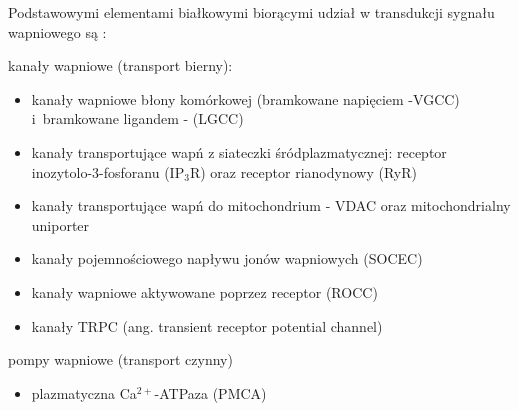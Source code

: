 Podstawowymi elementami białkowymi biorącymi udział w transdukcji sygnału wapniowego są \cite{Berridge2012,Lytton2007,Schwaller2012}:

\begin{bulletList}
\label{bialkaTransportowe}

\item kanały wapniowe (transport bierny):
	\begin{itemize}[label=\textopenbullet]
	\item kanały wapniowe błony komórkowej (bramkowane napięciem -VGCC) \\ i~bramkowane ligandem - (LGCC)
	\item kanały transportujące wapń z siateczki śródplazmatycznej: receptor\\ \mbox{inozytolo-3-fosforanu} (IP$_3$R)  oraz receptor rianodynowy (RyR)
	\item kanały transportujące wapń do mitochondrium - VDAC  oraz mitochondrialny uniporter
	\item kanały pojemnościowego napływu jonów wapniowych (SOCEC)
	\item kanały wapniowe aktywowane poprzez receptor (ROCC)
	\item kanały TRPC (ang. transient receptor potential channel)
	\end{itemize}
\item pompy wapniowe (transport czynny)
	\begin{itemize}[label=\textopenbullet]
	\item plazmatyczna Ca$^{2+}$-ATPaza (PMCA)

\end{itemize}
\end{bulletList}

